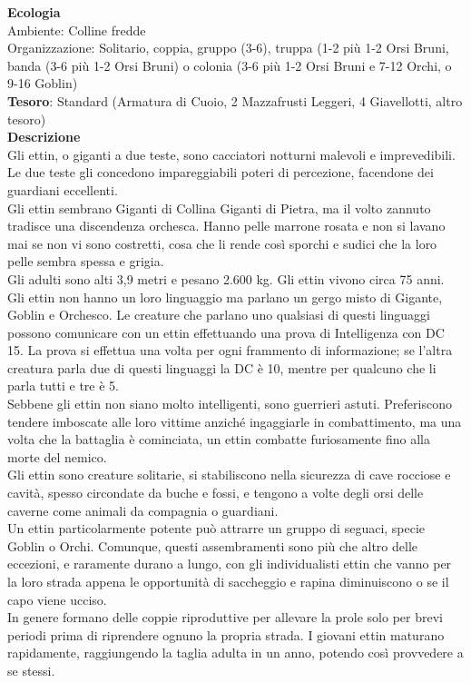 \begin{multicols}{2}
\textbf{Ecologia}\\
Ambiente: Colline fredde\\
Organizzazione: Solitario, coppia, gruppo (3-6), truppa (1-2 più 1-2 Orsi Bruni, banda (3-6 più 1-2 Orsi Bruni) o colonia (3-6 più 1-2 Orsi Bruni e 7-12 Orchi, o 9-16 Goblin)\\
\textbf{Tesoro}: Standard (Armatura di Cuoio, 2 Mazzafrusti Leggeri, 4 Giavellotti, altro tesoro)\\
\textbf{Descrizione}\\
Gli ettin, o giganti a due teste, sono cacciatori notturni malevoli e imprevedibili. Le due teste gli concedono impareggiabili poteri di percezione, facendone dei guardiani eccellenti.\\
Gli ettin sembrano Giganti di Collina Giganti di Pietra, ma il volto zannuto tradisce una discendenza orchesca. Hanno pelle marrone rosata e non si lavano mai se non vi sono costretti, cosa che li rende così sporchi e sudici che la loro pelle sembra spessa e grigia.\\
Gli adulti sono alti 3,9 metri e pesano 2.600 kg. Gli ettin vivono circa 75 anni.\\
Gli ettin non hanno un loro linguaggio ma parlano un gergo misto di Gigante, Goblin e Orchesco. Le creature che parlano uno qualsiasi di questi linguaggi possono comunicare con un ettin effettuando una prova di Intelligenza con DC 15. La prova si effettua una volta per ogni frammento di informazione; se l'altra creatura parla due di questi linguaggi la DC è 10, mentre per qualcuno che li parla tutti e tre è 5.\\
Sebbene gli ettin non siano molto intelligenti, sono guerrieri astuti. Preferiscono tendere imboscate alle loro vittime anziché ingaggiarle in combattimento, ma una volta che la battaglia è cominciata, un ettin combatte furiosamente fino alla morte del nemico.\\
Gli ettin sono creature solitarie, si stabiliscono nella sicurezza di cave rocciose e cavità, spesso circondate da buche e fossi, e tengono a volte degli orsi delle caverne come animali da compagnia o guardiani.\\
Un ettin particolarmente potente può attrarre un gruppo di seguaci, specie Goblin o Orchi. Comunque, questi assembramenti sono più che altro delle eccezioni, e raramente durano a lungo, con gli individualisti ettin che vanno per la loro strada appena le opportunità di saccheggio e rapina diminuiscono o se il capo viene ucciso.\\
In genere formano delle coppie riproduttive per allevare la prole solo per brevi periodi prima di riprendere ognuno la propria strada. I giovani ettin maturano rapidamente, raggiungendo la taglia adulta in un anno, potendo così provvedere a se stessi.


\end{multicols}

